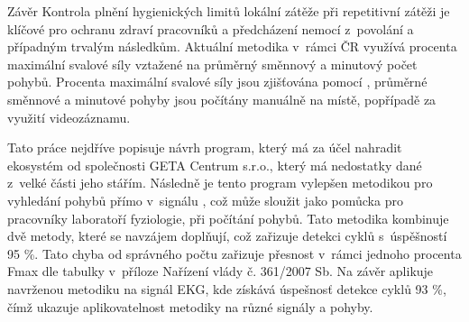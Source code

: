 \chap Závěr
    Kontrola plnění hygienických limitů lokální zátěže při repetitivní zátěži je klíčové pro ochranu zdraví pracovníků a předcházení nemocí z~povolání a případným trvalým následkům. Aktuální metodika v~rámci ČR využívá procenta maximální svalové síly vztažené na průměrný směnnový a minutový počet pohybů. Procenta maximální svalové síly jsou zjišťována pomocí , průměrné směnnové a minutové pohyby jsou počítány manuálně na místě, popřípadě za využití videozáznamu.

    Tato práce nejdříve popisuje návrh program, který má za účel nahradit ekosystém od společnosti GETA Centrum s.r.o., který má nedostatky dané z~velké části jeho stářím. Následně je tento program vylepšen metodikou pro vyhledání pohybů přímo v~signálu , což může sloužit jako pomůcka pro pracovníky laboratoří fyziologie, při počítání pohybů. Tato metodika kombinuje dvě metody, které se navzájem doplňují, což zařizuje detekci cyklů s~úspěšností 95 \%. Tato chyba od správného počtu zařizuje přesnost v~rámci jednoho procenta Fmax dle tabulky v~příloze Nařízení vlády č. 361/2007 Sb. Na závěr aplikuje navrženou metodiku na signál EKG, kde získává úspešnosť detekce cyklů 93 \%, čímž ukazuje aplikovatelnost metodiky na různé signály a pohyby.
